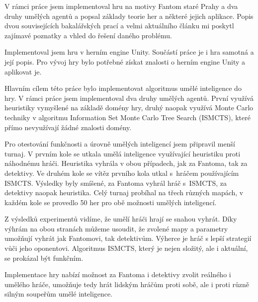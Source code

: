 
V rámci práce jsem implementoval hru na motivy Fantom staré Prahy a dva druhy umělých agentů a popsal základy teorie her a některé jejich aplikace. Popis dvou souvisejících bakalářských prací a velmi aktuálního článku mi poskytl zajímavé poznatky a vhled do řešení daného problému.

Implementoval jsem hru v herním engine Unity. Součástí práce je i hra samotná a její popis. Pro vývoj hry bylo potřebné získat znalosti o herním engine Unity a aplikovat je. 

Hlavním cílem této práce bylo implementovat algoritmus umělé inteligence do hry. V rámci práce jsem implementoval dva druhy umělých agentů. První využívá heuristiky vymyšlené na základě domény hry, druhý naopak využívá Monte Carlo techniky v algoritmu Information Set Monte Carlo Tree Search (ISMCTS), které přímo nevyužívají žádné znalosti domény. 

Pro otestování funkčnosti a úrovně umělých inteligencí jsem připravil menší turnaj. V prvním kole se utkala umělá inteligence využívající heuristiku proti náhodnému hráči. Heuristika vyhrála v obou případech, jak za Fantoma, tak za detektivy. Ve druhém kole se vítěz prvního kola utkal s~hráčem používajícím ISMCTS. Výsledky byly smíšené, za Fantoma vyhrál hráč s~ISMCTS, za detektivy naopak heuristika. Celý turnaj probíhal na třech různých mapách, v každém kole se provedlo 50 her pro obě možnosti umělých inteligencí.

Z výsledků experimentů vidíme, že umělí hráči hrají se snahou vyhrát. Díky výhrám na obou stranách můžeme usoudit, že zvolené mapy a parametry umožňují vyhrát jak Fantomovi, tak detektivům. Výherce je hráč s lepší strategií vůči jeho oponentovi. Algoritmus ISMCTS, který je nejen složitý, ale i aktuální, se prokázal být funkčním.

Implementace hry nabízí možnost za Fantoma i detektivy zvolit reálného i umělého hráče, umožňuje tedy hrát lidským hráčům proti sobě, ale i proti různě silným soupeřům umělé inteligence.